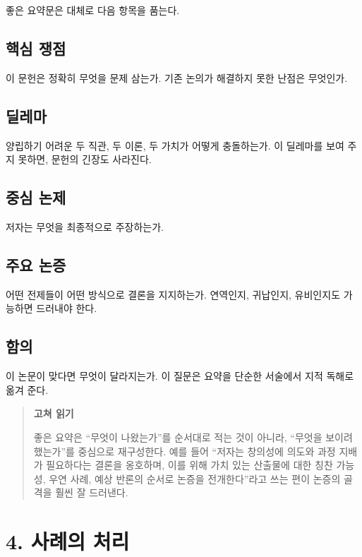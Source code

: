 좋은 요약문은 대체로 다음 항목을 품는다.

\subsection{핵심 쟁점}\label{uxd575uxc2ec-uxc7c1uxc810}

이 문헌은 정확히 무엇을 문제 삼는가. 기존 논의가 해결하지 못한 난점은 무엇인가.

\subsection{딜레마}\label{uxb51cuxb808uxb9c8}

양립하기 어려운 두 직관, 두 이론, 두 가치가 어떻게 충돌하는가. 이 딜레마를 보여 주지 못하면, 문헌의 긴장도 사라진다.

\subsection{중심 논제}\label{uxc911uxc2ec-uxb17cuxc81c}

저자는 무엇을 최종적으로 주장하는가.

\subsection{주요 논증}\label{uxc8fcuxc694-uxb17cuxc99d}

어떤 전제들이 어떤 방식으로 결론을 지지하는가. 연역인지, 귀납인지, 유비인지도 가능하면 드러내야 한다.

\subsection{함의}\label{uxd568uxc758}

이 논문이 맞다면 무엇이 달라지는가. 이 질문은 요약을 단순한 서술에서 지적 독해로 옮겨 준다.

\begin{quote}
\textbf{고쳐 읽기}

좋은 요약은 ``무엇이 나왔는가''를 순서대로 적는 것이 아니라, ``무엇을 보이려 했는가''를 중심으로 재구성한다. 예를 들어 ``저자는 창의성에 의도와 과정 지배가 필요하다는 결론을 옹호하며, 이를 위해 가치 있는 산출물에 대한 칭찬 가능성, 우연 사례, 예상 반론의 순서로 논증을 전개한다''라고 쓰는 편이 논증의 골격을 훨씬 잘 드러낸다.
\end{quote}

\section{4. 사례의 처리}\label{4-uxc0acuxb840uxc758-uxcc98uxb9ac}

